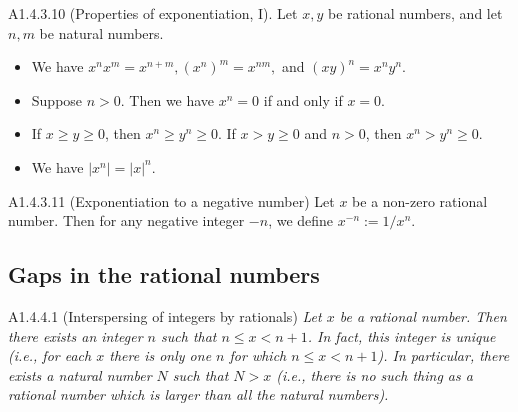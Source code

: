 \begin{proposition}{A1.4.3.10}
    (Properties of exponentiation, I). Let $x, y$ be rational numbers, and let $n, m$ be natural numbers.
    \begin{itemize}
        \item We have $x^n x^m = x^{n + m}, (x^n)^m = x^{nm}, $ and $(xy)^n = x^n y^n$.
        \item Suppose $n > 0$. Then we have $x^n = 0$ if and only if $x = 0$.
        \item If $x \geq y \geq 0$, then $x^n \geq y^n \geq 0$. If $x > y \geq 0$ and $n > 0$, then $x^n > y^n \geq 0$.
        \item We have $|x^n| = |x|^n$.
    \end{itemize}
\end{proposition}

\begin{definition}{A1.4.3.11}
    (Exponentiation to a negative number) Let $x$ be a non-zero rational number. Then for any negative integer $-n$, we
    define $x^{-n} := 1/x^n$.
\end{definition}


\subsection{Gaps in the rational numbers}
\begin{proposition}{A1.4.4.1}
    (Interspersing of integers by rationals) \emph{Let $x$ be a rational number. Then there exists an integer $n$ such
    that $n \leq x < n + 1$. In fact, this integer is unique (i.e., for each $x$ there is only one $n$ for which
    $n \leq x < n + 1$). In particular, there exists a natural number $N$ such that $N > x$ (i.e., there is no such
    thing as a rational number which is larger than all the natural numbers).}
\end{proposition}

